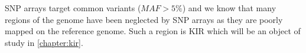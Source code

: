 SNP arrays target common variants ($MAF > 5\%$) and
we know that many regions of the genome have been neglected by SNP arrays as they are poorly mapped on the reference genome.
Such a region is KIR which will be an object of study in \cref{chapter:kir}.









